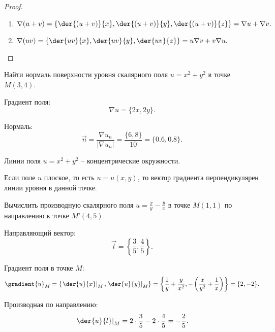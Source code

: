 \begin{enumerate}
\begin{proof}
	\begin{enumerate}
	\item \( \nabla(u + v) = \left\{ \der{(u + v)}{x},\der{(u + v)}{y}, \der{(u + v)}{z} \right\} = \nabla u + \nabla v. \)
	\item \( \nabla(uv) = \left\{ \der{uv}{x}, \der{uv}{y}, \der{uv}{z} \right\} = u\nabla v + v\nabla u. \)
	\end{enumerate}
	\end{proof}
	\end{enumerate}

	\begin{example}
	Найти нормаль поверхности уровня скалярного поля \( u = x^2 + y^2 \) в точке \( M(3, 4) \).
	\end{example}
	\begin{solution}
	
	Градиент поля:
	\[ \nabla u = \{ 2x, 2y \}. \]
	
	Нормаль:
	\[ \vec{n} = \frac{\nabla u_n}{|\nabla u_n|} = \frac{\{ 6, 8 \}}{10} = \{ 0.6, 0.8 \}. \]
	
	\begin{remark}
	Линии поля \( u = x^2 + y^2 \) -- концентрические окружности.
	\end{remark}
	
	\begin{remark}
	Если поле \( u \) плоское, то есть \( u = u(x, y) \), то вектор градиента перпендикулярен линии уровня в данной точке.
	\end{remark}
	\end{solution}
	
	\begin{example}
	Вычислить производную скалярного поля \( u = \frac{x}{y} - \frac{y}{x} \) в точке \( M(1, 1) \) по направлению к точке \( M’(4, 5) \).
	\end{example}
	\begin{solution}
	
	Направляющий вектор:
	\[ \vec{l} = \left\{ \frac{3}{5}, \frac{4}{5} \right\}. \]
	
	Градиент поля в точке \( M \):
	\[ \gradient{u}_M = \left\{ \left.\der{u}{x}\right|_M, \left.\der{u}{y}\right|_M \right\} = \left\{ \frac{1}{y} + \frac{y}{x^2}, -\left(\frac{x}{y^2} + \frac{1}{x}\right) \right\} = \{ 2, -2 \}. \]
	
	Производная по направлению:
	\[ \left.\der{u}{l}\right|_M = 2\cdot\frac{3}{5} - 2\cdot\frac{4}{5} = -\frac{2}{5}. \]
	\end{solution}
	

